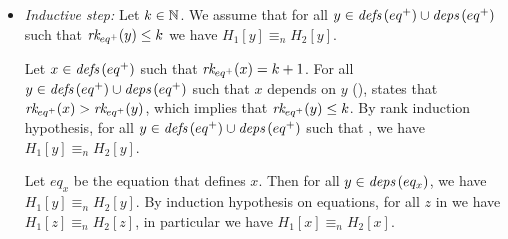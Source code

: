 \begin{skippableproof}
\begin{itemize}
              Therefore, there exists an equation $eq_x$ that defines $x$ and
              that has no dependency with . By induction hypothesis on equations
              structure, for all $z$ in  we have $H_1[z] \equiv_n H_2[z]$, in particular
              we have $H_1[x] \equiv_n H_2[x]$.

        \item \textit{Inductive step:} Let $k \in \mathbb{N}$.
              We assume that for all $y \in {\ensuremath{\textit{defs}\left(eq^+\right)}} \cup {\ensuremath{\textit{deps}\left(eq^+\right)}}$ such that
              ${\textit{rk}_{eq^+}(y)} \le k$ we have $H_1[y] \equiv_n H_2[y]$.

              Let $x \in {\ensuremath{\textit{defs}\left(eq^+\right)}}$ such that ${\textit{rk}_{eq^+}(x)} = k+1$.
              For all $y \in {\ensuremath{\textit{defs}\left(eq^+\right)}} \cup {\ensuremath{\textit{deps}\left(eq^+\right)}}$ such that $x$ depends on $y$ (\ie {}),
              states that ${\textit{rk}_{eq^+}(x)} > {\textit{rk}_{eq^+}(y)}$, which implies that ${\textit{rk}_{eq^+}(y)} \le k$.
              By rank induction hypothesis, for all $y \in {\ensuremath{\textit{defs}\left(eq^+\right)}} \cup {\ensuremath{\textit{deps}\left(eq^+\right)}}$ such that
              , we have $H_1[y] \equiv_n H_2[y]$.

              Let $eq_x$ be the equation that defines $x$. Then for all $y \in {\ensuremath{\textit{deps}\left(eq_x\right)}}$, we have
              $H_1[y] \equiv_n H_2[y]$. By induction hypothesis on equations, for all $z$
              in  we have $H_1[z] \equiv_n H_2[z]$, in particular we have $H_1[x]
                  \equiv_n H_2[x]$.
    \end{itemize}

    \setcounter{paragraph}{0}
\end{skippableproof}

